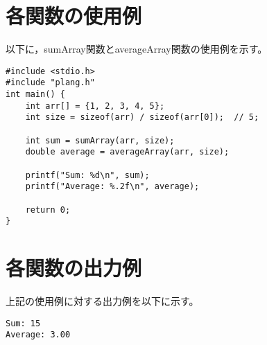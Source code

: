 \documentclass[uplatex,dvipdfmx]{jsarticle}
\begin{document}
\section{各関数の使用例}
以下に，sumArray関数とaverageArray関数の使用例を示す。
\begin{verbatim}
#include <stdio.h>
#include "plang.h"
int main() {
    int arr[] = {1, 2, 3, 4, 5};
    int size = sizeof(arr) / sizeof(arr[0]);  // 5;

    int sum = sumArray(arr, size);
    double average = averageArray(arr, size);

    printf("Sum: %d\n", sum);
    printf("Average: %.2f\n", average);

    return 0;
}
\end{verbatim}

\section{各関数の出力例}
上記の使用例に対する出力例を以下に示す。
\begin{verbatim}
Sum: 15
Average: 3.00
\end{verbatim}
\end{document}
